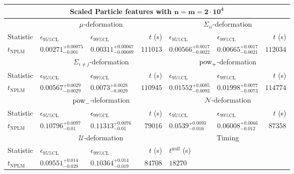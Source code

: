 \begin{tabular}{l|llr|llr}
	\toprule
	\multicolumn{7}{c}{{\bf Scaled Particle features with $\mathbf{n=m=2\cdot 10^{4}}$}} \\
	\toprule
	\multicolumn{1}{c}{} & \multicolumn{3}{c}{$\mu$-deformation} & \multicolumn{3}{c}{$\Sigma_{ii}$-deformation} \\
	Statistic & $\epsilon_{95\%\mathrm{CL}}$ & $\epsilon_{99\%\mathrm{CL}}$ & $t$ (s) & $\epsilon_{95\%\mathrm{CL}}$ & $\epsilon_{99\%\mathrm{CL}}$ & $t$ (s) \\
	\midrule
	$t_{\mathrm{NPLM}}$ & $0.00271_{-0.001}^{+0.00075}$ & $0.00311_{-0.00089}^{+0.00067}$ & $111013$ & $0.00566_{-0.0022}^{+0.0017}$ & $0.00665_{-0.0021}^{+0.0017}$ & $112034$ \\
	\toprule
	\multicolumn{1}{c}{} & \multicolumn{3}{c}{$\Sigma_{i\neq j}$-deformation} & \multicolumn{3}{c}{$\rm{pow}_{+}$-deformation} \\
	Statistic & $\epsilon_{95\%\mathrm{CL}}$ & $\epsilon_{99\%\mathrm{CL}}$ & $t$ (s) & $\epsilon_{95\%\mathrm{CL}}$ & $\epsilon_{99\%\mathrm{CL}}$ & $t$ (s) \\
	\midrule
	$t_{\mathrm{NPLM}}$ & $0.00567_{-0.0029}^{+0.0029}$ & $0.0073_{-0.0029}^{+0.0028}$ & $110945$ & $0.01552_{-0.0093}^{+0.0085}$ & $0.01998_{-0.0073}^{+0.0077}$ & $114774$ \\
	\toprule
	\multicolumn{1}{c}{} & \multicolumn{3}{c}{$\rm{pow}_{-}$-deformation} & \multicolumn{3}{c}{$\mathcal{N}$-deformation} \\
	Statistic & $\epsilon_{95\%\mathrm{CL}}$ & $\epsilon_{99\%\mathrm{CL}}$ & $t$ (s) & $\epsilon_{95\%\mathrm{CL}}$ & $\epsilon_{99\%\mathrm{CL}}$ & $t$ (s) \\
	\midrule
	$t_{\mathrm{NPLM}}$ & $0.10796_{-0.01}^{+0.0097}$ & $0.11313_{-0.01}^{+0.0076}$ & $79016$ & $0.0539_{-0.016}^{+0.0093}$ & $0.06008_{-0.012}^{+0.0066}$ & $87358$ \\
	\toprule
	\multicolumn{1}{c}{} & \multicolumn{3}{c}{$\mathcal{U}$-deformation} & \multicolumn{3}{c}{Timing} \\
	Statistic & $\epsilon_{95\%\mathrm{CL}}$ & $\epsilon_{99\%\mathrm{CL}}$ & $t$ (s) & $t^{\mathrm{null}}$ (s) \\
	\midrule
	$t_{\mathrm{NPLM}}$ & $0.09551_{-0.029}^{+0.014}$ & $0.10364_{-0.019}^{+0.014}$ & $84708$ & $18270$ \\
	\bottomrule
\end{tabular}